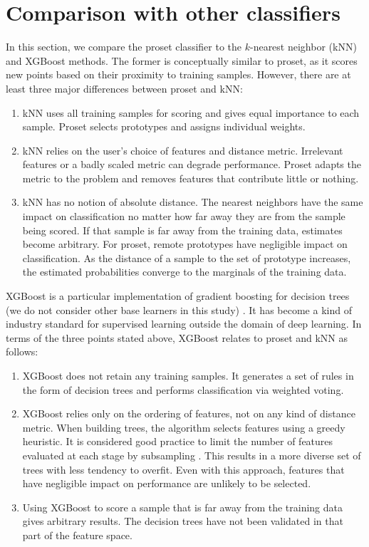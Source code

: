 \section{Comparison with other classifiers}
\label{sec_classifier_comparison}
%
In this section, we compare the proset classifier to the $k$-nearest neighbor (kNN) and XGBoost methods.
The former is conceptually similar to proset, as it scores new points based on their proximity to training samples.
However, there are at least three major differences between proset and kNN:
%
\begin{enumerate}
\item kNN uses all training samples for scoring and gives equal importance to each sample.
Proset selects prototypes and assigns individual weights.
%
\item kNN relies on the user's choice of features and distance metric.
Irrelevant features or a badly scaled metric can degrade performance.
Proset adapts the metric to the problem and removes features that contribute little or nothing.
%
\item kNN has no notion of absolute distance.
The nearest neighbors have the same impact on classification no matter how far away they are from the sample being scored.
If that sample is far away from the training data, estimates become arbitrary.
For proset, remote prototypes have negligible impact on classification.
As the distance of a sample to the set of prototype increases, the estimated probabilities converge to the marginals of the training data.
\end{enumerate}
%
XGBoost is a particular implementation of gradient boosting for decision trees (we do not consider other base learners in this study) \cite{Chen_16}.
It has become a kind of industry standard for supervised learning outside the domain of deep learning.
In terms of the three points stated above, XGBoost relates to proset and kNN as follows:
%
\begin{enumerate}
\item XGBoost does not retain any training samples.
It generates a set of rules in the form of decision trees and performs classification via weighted voting.
%
\item XGBoost relies only on the ordering of features, not on any kind of distance metric.
When building trees, the algorithm selects features using a greedy heuristic.
It is considered good practice to limit the number of features evaluated at each stage by subsampling \cite{Chen_16}.
This results in a more diverse set of trees with less tendency to overfit.
Even with this approach, features that have negligible impact on performance are unlikely to be selected.
%
\item Using XGBoost to score a sample that is far away from the training data gives arbitrary results.
The decision trees have not been validated in that part of the feature space.
\end{enumerate}
